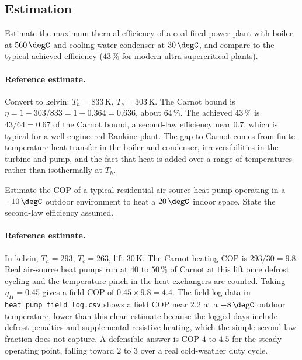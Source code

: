 \subsection*{Estimation}

\begin{exercise}
Estimate the maximum thermal efficiency of a coal-fired power plant
with boiler at $560\,\degC$ and cooling-water condenser at $30\,\degC$,
and compare to the typical achieved efficiency ($43\,\%$ for modern
ultra-supercritical plants).

\paragraph{Reference estimate.} Convert to kelvin: $T_h = 833\,\si{
\kelvin}$, $T_c = 303\,\si{\kelvin}$. The Carnot bound is $\eta = 1 -
303/833 = 1 - 0.364 = 0.636$, about $64\,\%$. The achieved $43\,\%$ is
$43/64 = 0.67$ of the Carnot bound, a second-law efficiency near $0.7$,
which is typical for a well-engineered Rankine plant. The gap to Carnot
comes from finite-temperature heat transfer in the boiler and
condenser, irreversibilities in the turbine and pump, and the fact that
heat is added over a range of temperatures rather than isothermally at
$T_h$.
\end{exercise}

\begin{exercise}
Estimate the COP of a typical residential air-source heat pump
operating in a $-10\,\degC$ outdoor environment to heat a $20\,\degC$
indoor space. State the second-law efficiency assumed.

\paragraph{Reference estimate.} In kelvin, $T_h = 293$, $T_c = 263$,
lift $30\,\si{\kelvin}$. The Carnot heating COP is $293/30 = 9.8$. Real
air-source heat pumps run at $40$ to $50\,\%$ of Carnot at this lift
once defrost cycling and the temperature pinch in the heat exchangers
are counted. Taking $\eta_{II} = 0.45$ gives a field COP of $0.45 \times
9.8 = 4.4$. The field-log data in \texttt{heat\_pump\_field\_log.csv}
shows a field COP near $2.2$ at a $-8\,\degC$ outdoor temperature, lower
than this clean estimate because the logged days include defrost
penalties and supplemental resistive heating, which the simple
second-law fraction does not capture. A defensible answer is COP $4$ to
$4.5$ for the steady operating point, falling toward $2$ to $3$ over a
real cold-weather duty cycle.
\end{exercise}

